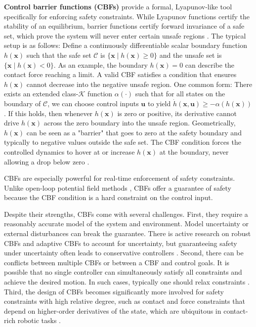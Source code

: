 \documentclass[Afour,sageh,times]{template/sagej}
\begin{document}
\textbf{Control barrier functions (CBFs)} provide a formal, Lyapunov-like tool specifically for enforcing safety constraints. While Lyapunov functions certify the stability of an equilibrium, barrier functions certify forward invariance of a safe set, which prove the system will never enter certain unsafe regions \citep{romdlony2016stabilization, ames2016control, ames2019cbf}. The typical setup is as follows: Define a continuously differentiable scalar boundary function $h(\boldsymbol{x})$ such that the safe set $\mathcal{C}$ is $\{\boldsymbol{x} \mid h(\boldsymbol{x}) \ge 0\}$ and the unsafe set is $\{\boldsymbol{x} \mid h(\boldsymbol{x}) < 0\}$. As an example, the boundary $h(\boldsymbol{x})=0$ can describe the contact force reaching a limit. A valid CBF satisfies a condition that ensures $h(\boldsymbol{x})$ cannot decrease into the negative unsafe region. One common form: There exists an extended class-$\mathcal{K}$ function $\alpha(\cdot)$ such that for all states on the boundary of $\mathcal{C}$, we can choose control inputs $\boldsymbol{u}$ to yield $\dot{h}(\boldsymbol{x}, \boldsymbol{u}) \ge -\alpha(h(\boldsymbol{x}))$. If this holds, then whenever $h(\boldsymbol{x})$ is zero or positive, its derivative cannot drive $h(\boldsymbol{x})$ across the zero boundary into the unsafe region. 
Geometrically, $h(\boldsymbol{\boldsymbol{x}})$ can be seen as a "barrier" that goes to zero at the safety boundary and typically to negative values outside the safe set. 
The CBF condition forces the controlled dynamics to hover at or increase $h(\boldsymbol{x})$ at the boundary, never allowing a drop below zero \citep{wu2015safety}.

CBFs are especially powerful for real-time enforcement of safety constraints. Unlike open-loop potential field methods \citep{batinovic2022path, pan2021improved}, CBFs offer a guarantee of safety because the CBF condition is a hard constraint on the control input. 

Despite their strengths, CBFs come with several challenges. First, they require a reasonably accurate model of the system and environment. Model uncertainty or external disturbances can break the guarantee. There is active research on robust CBFs and adaptive CBFs to account for uncertainty, but guaranteeing safety under uncertainty often leads to conservative controllers \citep{pati2023robust, buch2021robust, wang2025safe}. Second, there can be conflicts between multiple CBFs or between a CBF and control goals. It is possible that no single controller can simultaneously satisfy all constraints and achieve the desired motion. In such cases, typically one should relax constraints \citep{isaly2024feasibility, breeden2023compositions}. Third, the design of CBFs becomes significantly more involved for safety constraints with high relative degree, such as contact and force constraints that depend on higher-order derivatives of the state, which are ubiquitous in contact-rich robotic tasks \citep{breeden2021high, wang2022high, wong2025contact}.
\end{document}
